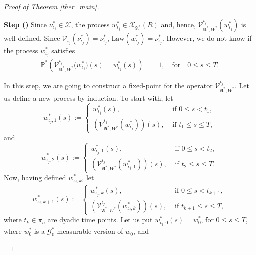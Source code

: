 \documentclass[english,a4paper,11pt]{amsart}
\theoremstyle{plain}
\theoremstyle{definition}
\theoremstyle{remark}
\numberwithin{equation}{section}
\newcounter{lil1}
\newenvironment{step}
{\begin{list} { \bf Step (\Roman{lil1})}
		{ \usecounter{lil1}
			\setlength{\leftmargin}{0.0cm}
			\setlength{\topsep}{0.2cm}
			\setlength{\itemsep}{0.0cm}
			\setlength{\parsep}{0.1cm}
			\setlength{\itemindent}{0.8cm}
			\setlength{\parskip}{0.0cm}}}
	{\end{list}}
\newcounter{lil33}
\newcounter{lil1q}
\newcommand{\Law}{\mbox{Law}}
\newcommand{\PP}{{\mathbb{P}}}
\newcommand{\Gcal} {{\mathcal G}}
\begin{document}
\begin{proof}[Proof of Theorem \ref{ther_main}]
\begin{step}
Since $\nu^\ast_{\iota_j}\in \mathscr{X}$, the process $w^\ast_{\iota_j}\in\mathcal{X}_{\mathfrak{A}^\ast}(R)$ and, hence, 
$\mathcal{V}_{\mathfrak{A}^\ast,W^\ast}^{\iota_j}(w^\ast_{\iota_j})$ is well-defined.
Since $\mathscr{V}_{\iota_j}(\nu^\ast_{\iota_j})=\nu^\ast_{\iota_j}$, $\Law(w^\ast_{\iota_j})=\nu^\ast_{\iota_j}$.
However, we do not know if
the process $w^\ast_{\iota_j}$ satisfies
\begin{align*}
\PP^\ast\left(
\mathcal{V}_{\mathfrak{A}^\ast,W^\ast}^{\iota_j}\big(w^\ast_{\iota_j}\big) (s) =w^\ast_{\iota_j}(s)\right)=&1, \quad \mbox{for} \quad 0\le s\le T
.
\end{align*}



In this step, we are going to construct a fixed-point for the operator $\mathcal{V}_{\mathfrak{A}^\ast,W^\ast}^{\iota_j}$.
Let us define a new process by induction. To start with, let
\begin{equation}\label{nummer1}
w^\ast_{\iota_j,1}(s) :=  \begin{cases}
	w^\ast_{\iota_j}(s),& \mbox{ if } 0\le s<t_1,
	\\
	\left(\mathcal{V}_{\mathfrak{A}^\ast,W^\ast}^{\iota_j}(w^\ast_{\iota_j})\right)(s),& \mbox{ if } t_1\le s\le T,
\end{cases}
\end{equation}
and
\begin{equation}\label{nummer2}
w^\ast_{\iota_j,2}(s) :=\begin{cases}
	w^\ast_{\iota_j,1}(s),& \mbox{ if } 0\le s<t_2,
	\\
	\left(\mathcal{V}_{\mathfrak{A}^\ast,W^\ast}^{\iota_j}(w^\ast_{\iota_j,1})\right)(s),& \mbox{ if } t_2\le s\le T.
\end{cases}
\end{equation}
Now, having defined $w^\ast_{\iota_j,k}$, let
\begin{equation}\label{nummerk}
w^\ast_{\iota_j,k+1}(s) :=  \begin{cases}
	w^\ast_{\iota_j,k}(s),& \mbox{ if } 0\le s<t_{k+1},
	\\
	\left(\mathcal{V}_{\mathfrak{A}^\ast,W^\ast}^{\iota_j}(w^\ast_{\iota_j,k})\right)(s),& \mbox{ if } t_{k+1}\le s\le T,
\end{cases}
\end{equation}
where $t_k\in\pi_n$ are dyadic time points.
Let us put $  w^\ast_{\iota_j,0}(s)=w_0^\ast$, for $0\le s\le T$, where $ w_0^\ast$ is a $\Gcal^\ast_0$-measurable version of $w_0$, and
\begin{equation}\label{definfty}

\end{equation}
\end{step}
\end{proof}
\end{document}
